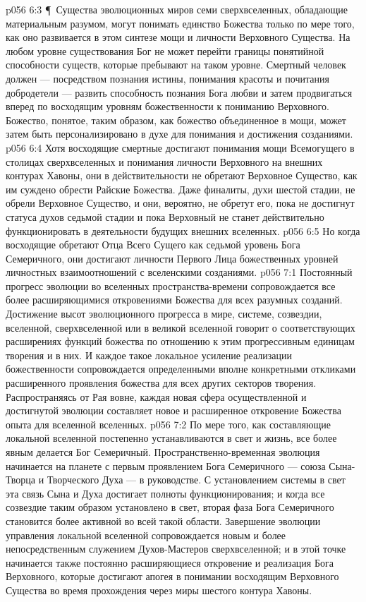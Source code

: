\vs p056 6:3 \P\ Существа эволюционных миров семи сверхвселенных, обладающие материальным разумом, могут понимать единство Божества только по мере того, как оно развивается в этом синтезе мощи и личности Верховного Существа. На любом уровне существования Бог не может перейти границы понятийной способности существ, которые пребывают на таком уровне. Смертный человек должен --- посредством познания истины, понимания красоты и почитания добродетели --- развить способность познания Бога любви и затем продвигаться вперед по восходящим уровням божественности к пониманию Верховного. Божество, понятое, таким образом, как божество объединенное в мощи, может затем быть персонализировано в духе для понимания и достижения созданиями.
\vs p056 6:4 Хотя восходящие смертные достигают понимания мощи Всемогущего в столицах сверхвселенных и понимания личности Верховного на внешних контурах Хавоны, они в действительности не обретают Верховное Существо, как им суждено обрести Райские Божества. Даже финалиты, духи шестой стадии, не обрели Верховное Существо, и они, вероятно, не обретут его, пока не достигнут статуса духов седьмой стадии и пока Верховный не станет действительно функционировать в деятельности будущих внешних вселенных.
\vs p056 6:5 Но когда восходящие обретают Отца Всего Сущего как седьмой уровень Бога Семеричного, они достигают личности Первого Лица  божественных уровней личностных взаимоотношений с вселенскими созданиями.
\vs p056 7:1 Постоянный прогресс эволюции во вселенных пространства\hyp{}времени сопровождается все более расширяющимися откровениями Божества для всех разумных созданий. Достижение высот эволюционного прогресса в мире, системе, созвездии, вселенной, сверхвселенной или в великой вселенной говорит о соответствующих расширениях функций божества по отношению к этим прогрессивным единицам творения и в них. И каждое такое локальное усиление реализации божественности сопровождается определенными вполне конкретными откликами расширенного проявления божества для всех других секторов творения. Распространяясь от Рая вовне, каждая новая сфера осуществленной и достигнутой эволюции составляет новое и расширенное откровение Божества опыта для вселенной вселенных.
\vs p056 7:2 По мере того, как составляющие локальной вселенной постепенно устанавливаются в свет и жизнь, все более явным делается Бог Семеричный. Пространственно\hyp{}временная эволюция начинается на планете с первым проявлением Бога Семеричного --- союза Сына\hyp{}Творца и Творческого Духа --- в руководстве. С установлением системы в свет эта связь Сына и Духа достигает полноты функционирования; и когда все созвездие таким образом установлено в свет, вторая фаза Бога Семеричного становится более активной во всей такой области. Завершение эволюции управления локальной вселенной сопровождается новым и более непосредственным служением Духов\hyp{}Мастеров сверхвселенной; и в этой точке начинается также постоянно расширяющиеся откровение и реализация Бога Верховного, которые достигают апогея в понимании восходящим Верховного Существа во время прохождения через миры шестого контура Хавоны.

